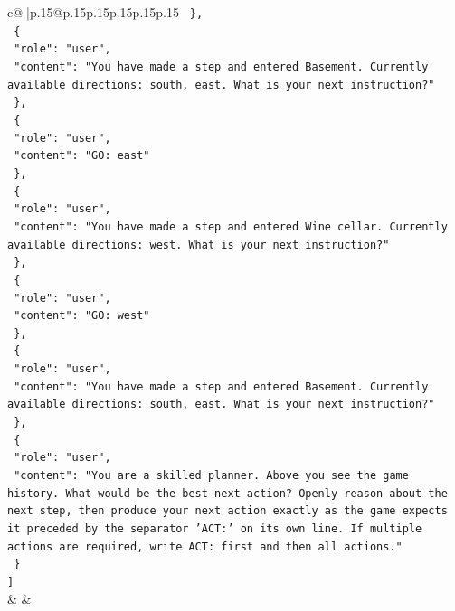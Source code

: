 \documentclass{article}
\begin{document}
{\begin{supertabular}{c@{$\;$}|p{.15\linewidth}@{}p{.15\linewidth}p{.15\linewidth}p{.15\linewidth}p{.15\linewidth}p{.15\linewidth}}
{{{\texttt{  \},} \\
\texttt{  \{} \\
\texttt{    "role": "user",} \\
\texttt{    "content": "You have made a step and entered Basement. Currently available directions: south, east. What is your next instruction?"} \\
\texttt{  \},} \\
\texttt{  \{} \\
\texttt{    "role": "user",} \\
\texttt{    "content": "GO: east"} \\
\texttt{  \},} \\
\texttt{  \{} \\
\texttt{    "role": "user",} \\
\texttt{    "content": "You have made a step and entered Wine cellar. Currently available directions: west. What is your next instruction?"} \\
\texttt{  \},} \\
\texttt{  \{} \\
\texttt{    "role": "user",} \\
\texttt{    "content": "GO: west"} \\
\texttt{  \},} \\
\texttt{  \{} \\
\texttt{    "role": "user",} \\
\texttt{    "content": "You have made a step and entered Basement. Currently available directions: south, east. What is your next instruction?"} \\
\texttt{  \},} \\
\texttt{  \{} \\
\texttt{    "role": "user",} \\
\texttt{    "content": "You are a skilled planner. Above you see the game history. What would be the best next action? Openly reason about the next step, then produce your next action exactly as the game expects it preceded by the separator 'ACT:' on its own line. If multiple actions are required, write ACT: first and then all actions."} \\
\texttt{  \}} \\
\texttt{{]}} \\
            }
        }
    }
    & & \\ \\


\end{supertabular}}
\end{document}
